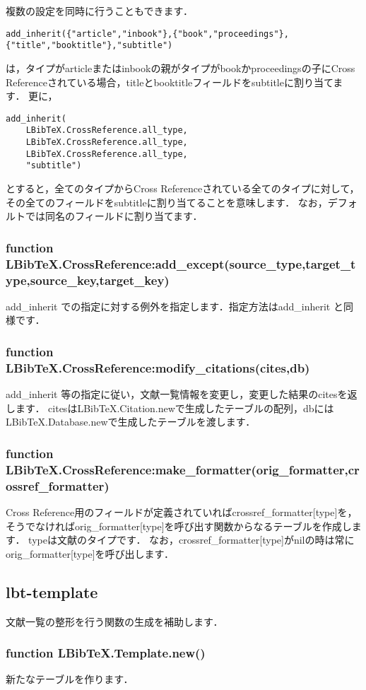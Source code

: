 \documentclass[dvipdfmx,a4paper]{jsarticle}
\begin{document}
複数の設定を同時に行うこともできます．
\begin{lstlisting}
add_inherit({"article","inbook"},{"book","proceedings"},{"title","booktitle"},"subtitle")
\end{lstlisting}
は，タイプがarticleまたはinbookの親がタイプがbookかproceedingsの子にCross Referenceされている場合，titleとbooktitleフィールドをsubtitleに割り当てます．
更に，
\begin{lstlisting}
add_inherit(
	LBibTeX.CrossReference.all_type,
	LBibTeX.CrossReference.all_type,
	LBibTeX.CrossReference.all_type,
	"subtitle")
\end{lstlisting}
とすると，全てのタイプからCross Referenceされている全てのタイプに対して，その全てのフィールドをsubtitleに割り当てることを意味します．
なお，デフォルトでは同名のフィールドに割り当てます．

\subsubsection{function LBibTeX.CrossReference:add\_except(source\_type,target\_type,source\_key,target\_key)}
add\_inherit での指定に対する例外を指定します．指定方法はadd\_inherit と同様です．

\subsubsection{function LBibTeX.CrossReference:modify\_citations(cites,db)}
add\_inherit 等の指定に従い，文献一覧情報を変更し，変更した結果のcitesを返します．
citesはLBibTeX.Citation.newで生成したテーブルの配列，dbにはLBibTeX.Database.newで生成したテーブルを渡します．

\subsubsection{function LBibTeX.CrossReference:make\_formatter(orig\_formatter,crossref\_formatter)}
Cross Reference用のフィールドが定義されていればcrossref\_formatter[type]を，そうでなければorig\_formatter[type]を呼び出す関数からなるテーブルを作成します．
typeは文献のタイプです．
なお，crossref\_formatter[type]がnilの時は常にorig\_formatter[type]を呼び出します．

\subsection{lbt-template}
文献一覧の整形を行う関数の生成を補助します．

\subsubsection{function LBibTeX.Template.new()}
新たなテーブルを作ります．
\end{document}
